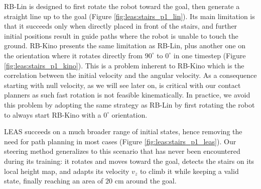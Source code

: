 RB-Lin is designed to first rotate the robot toward the goal, then generate a straight line up to the goal (Figure \ref{fig:leas:stairs_p1_lin}). Its main limitation is that it succeeds only when directly placed in front of the stairs, and further initial positions result in guide paths where the robot is unable to touch the ground.
RB-Kino presents the same limitation as RB-Lin, plus another one on the orientation where it rotates directly from $90^{\circ}$ to $0^{\circ}$ in one timestep (Figure \ref{fig:leas:stairs_p1_kino}). This is a problem inherent to RB-Kino which is the correlation between the initial velocity and the angular velocity. As a consequence starting with null velocity, as we will see later on, is critical with our contact planners as such fast rotation is not feasible kinematically. 
In practice, we avoid this problem by adopting the same strategy as RB-Lin by first rotating the robot to always start RB-Kino with a $0^{\circ}$ orientation.

LEAS  succeeds on a much broader range of initial states, hence removing the need for path planning in most cases (Figure \ref{fig:leas:stairs_p1_leas}). Our steering method generalizes to this scenario that has never been encountered during its training: it rotates and moves toward the goal, detects the stairs on its local height map, and adapts its velocity $v_z$ to climb it while keeping a valid state, finally reaching an area of $20$ cm around the goal.

\hfill \break
\hfill \break

